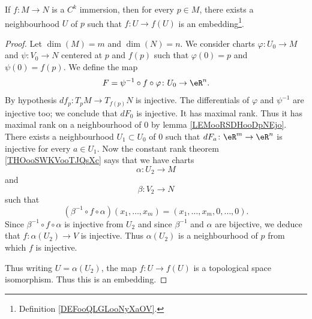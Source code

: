 \begin{proposition}	\label{PROPooYIQXooADMFXZ}
	If \(f \colon M\to N  \) is a \( C^k\) immersion, then for every \( p\in M\), there exists a neighbourhood \( U\) of \( p\) such that \(f \colon U\to f(U)  \) is an embedding\footnote{Definition \ref{DEFooQLGLooNyXaOV}.}.
\end{proposition}

\begin{proof}
	Let \( \dim(M)=m\) and \( \dim(N)=n\). We consider charts \(\varphi \colon U_0\to M  \) and \(\psi \colon V_0\to N  \) centered at \( p\) and \( f(p)\) such that \( \varphi(0)=p\) and \( \psi(0)=f(p)\). We define the map
	\begin{equation}
		F=\psi^{-1}\circ f\circ \varphi \colon U_0\to \eR^n.
	\end{equation}
	By hypothesis \(df_p \colon T_pM\to T_{f(p)}N  \) is injective. The differentials of \( \varphi\) and \( \psi^{-1}\) are injective too; we conclude that \( dF_0\) is injective. It has maximal rank. Thus it has maximal rank on a neighbourhood of \( 0\) by lemma \ref{LEMooRSDHooDpNEjo}. There exists a neighbourhood \( U_1\subset U_0\) of \( 0\) such that \(dF_a \colon \eR^m\to \eR^n  \) is injective for every \( a\in U_1\). Now the constant rank theorem \ref{THOooSWKVooTJQsXc} says that we have charts
	\begin{equation}
		\alpha \colon U_2\to M
	\end{equation}
	and
	\begin{equation}
		\beta \colon V_2\to N
	\end{equation}
	such that
	\begin{equation}
		(\beta^{-1}\circ f\circ \alpha)(x_1,\ldots,x_m)=(x_1,\ldots,x_m,0,\ldots,0).
	\end{equation}
	Since \( \beta^{-1}\circ f\circ \alpha\) is injective from \( U_2\) and since \( \beta^{-1}\) and \( \alpha\) are bijective, we deduce that \(f \colon \alpha(U_2)\to V  \) is injective. Thus \( \alpha(U_2)\) is a neighbourhood of \( p\) from which \( f\) is injective.

	Thus writing \( U=\alpha(U_2)\), the map \(f \colon U\to f(U)  \) is a topological space isomorphism. Thus this is an embedding.
\end{proof}

